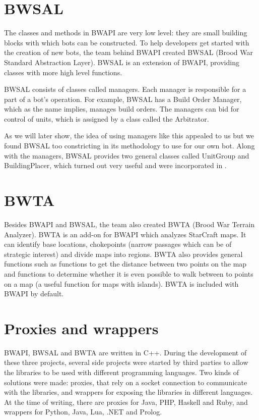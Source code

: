 \section{BWSAL}
\label{sec:bwsal}

The classes and methods in BWAPI are very low level: they are small building blocks with which bots can be constructed. To help developers get started with the creation of new bots, the team behind BWAPI created BWSAL (Brood War Standard Abstraction Layer). BWSAL is an extension of BWAPI, providing classes with more high level functions.

BWSAL consists of classes called managers. Each manager is responsible for a part of a bot's operation. For example, BWSAL has a Build Order Manager, which as the name implies, manages build orders. The managers can bid for control of units, which is assigned by a class called the Arbitrator.

As we will later show, the idea of using managers like this appealed to us but we found BWSAL too constricting in its methodology to use for our own bot. Along with the managers, BWSAL provides two general classes called UnitGroup and BuildingPlacer, which turned out very useful and were incorporated in \massexpand.

\section{BWTA}
\label{sec:bwta}

Besides BWAPI and BWSAL, the team also created BWTA (Brood War Terrain Analyzer). BWTA is an add-on for BWAPI which analyzes StarCraft maps. It can identify base locations, chokepoints (narrow passages which can be of strategic interest) and divide maps into regions. BWTA also provides general functions such as functions to get the distance between two points on the map and functions to determine whether it is even possible to walk between to points on a map (a useful function for maps with islands). BWTA is included with BWAPI by default.

\section{Proxies and wrappers}

BWAPI, BWSAL and BWTA are written in C++. During the development of these three projects, several side projects were started by third parties to allow the libraries to be used with different programming languages. Two kinds of solutions were made: proxies, that rely on a socket connection to communicate with the libraries, and wrappers for exposing the libraries in different languages. At the time of writing, there are proxies for Java, PHP, Haskell and Ruby, and wrappers for Python, Java, Lua, .NET and Prolog.

